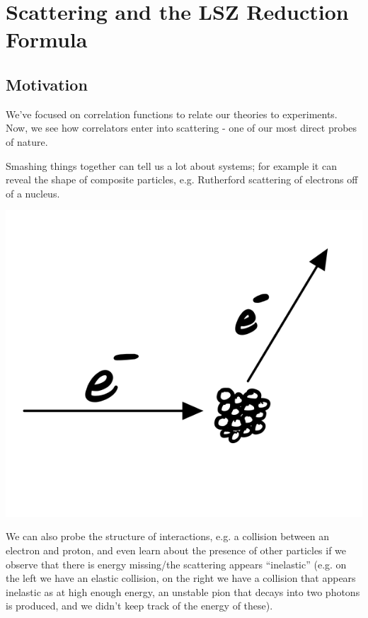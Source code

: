 \section{Scattering and the LSZ Reduction Formula}

\subsection{Motivation}
We've focused on correlation functions to relate our theories to experiments. Now, we see how correlators enter into scattering - one of our most direct probes of nature.

Smashing things together can tell us a lot about systems; for example it can reveal the shape of composite particles, e.g. Rutherford scattering of electrons off of a nucleus. 

\begin{center}
    \includegraphics[scale=0.3]{Lectures/Figures/lec16-rutherford.png}
\end{center}

We can also probe the structure of interactions, e.g. a collision between an electron and proton, and even learn about the presence of other particles if we observe that there is energy missing/the scattering appears ``inelastic'' (e.g. on the left we have an elastic collision, on the right we have a collision that appears inelastic as at high enough energy, an unstable pion that decays into two photons is produced, and we didn't keep track of the energy of these).

